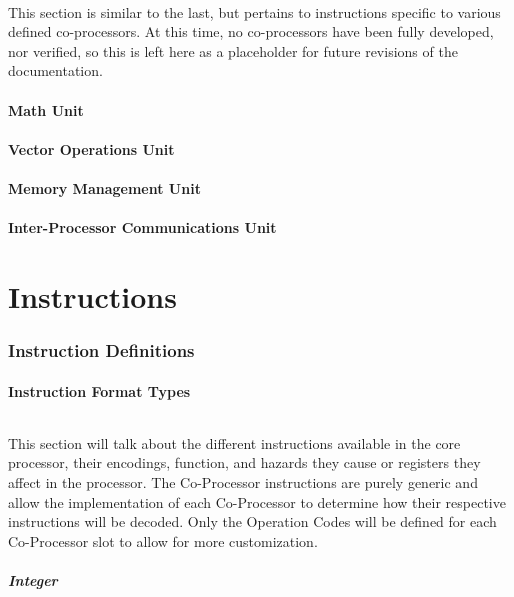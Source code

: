 \documentclass[letterpaper, 11pt]{article}
\begin{document}
\paragraph{}This section is similar to the last, but pertains to instructions specific to various defined co-processors. At this time,
no co-processors have been fully developed, nor verified, so this is left here as a placeholder for future revisions of the documentation.
\subsection{Math Unit}
\subsection{Vector Operations Unit}
\subsection{Memory Management Unit}
\subsection{Inter-Processor Communications Unit}

\clearpage

\part{Instructions}
\section{Instruction Definitions}
\subsection{Instruction Format Types}
\paragraph{}This section will talk about the different instructions available in the core processor, their encodings, function, and hazards
they cause or registers they affect in the processor. The Co-Processor instructions are purely generic and allow the implementation of
each Co-Processor to determine how their respective instructions will be decoded. Only the Operation Codes will be defined for each 
Co-Processor slot to allow for more customization.

\newpage
\subsubsection{Integer}
\end{document}
